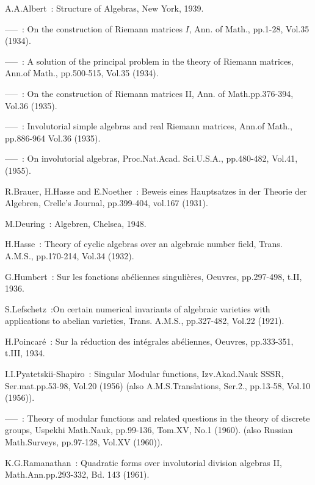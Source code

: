 \begin{thebibliography}{99}\pageoriginale
{} A.A.\@ Albert~: Structure of Algebras, New York, 1939.

 -----~: On the construction of Riemann matrices $I$, Ann.\@
of Math., pp.1-28, Vol.35 (1934).

 -----~: A solution of the principal problem in the theory
  of Riemann matrices, Ann.\@ of Math., pp.\@ 500-515, Vol.35 (1934).

 -----~: On the construction of Riemann matrices II, Ann.\@
  of Math.\@ pp.376-394, Vol.36 (1935).

 -----~: Involutorial simple algebras and real Riemann
  matrices, Ann.\@ of Math., pp.886-964 Vol.\@ 36 (1935).

 -----~: On involutorial algebras, Proc.\@ Nat.Acad.\@
  Sci.\@ U.S.A., pp.480-482, Vol.41, (1955).

 R.\@ Brauer, H.\@ Hasse and E.\@ Noether~: Beweis
  eines Hauptsatzes in der Theorie der Algebren, Crelle's Journal,
  pp.399-404, vol.167 (1931).

 M.\@ Deuring~: Algebren, Chelsea, 1948.

 H.\@ Hasse~: Theory of cyclic algebras over an algebraic
  number field, Trans. A.M.S., pp.170-214, Vol.34 (1932).

 G.\@ Humbert~: Sur les fonctions ab\'eliennes
  singuli\`eres, Oeuvres, pp.297-498, t.II, 1936.

 S.\@ Lefschetz~:\pageoriginale On certain numerical invariants of
  algebraic varieties with applications to abelian varieties, Trans.\@
  A.M.S., pp.327-482, Vol.22 (1921).

 H.\@ Poincar\'e~: Sur la r\'eduction des int\'egrales
  ab\'eliennes, Oeuvres, pp.333-351, t.III, 1934.

 I.I.\@ Pyatetskii-Shapiro~: Singular Modular functions,
  Izv.\@ Akad.\@ Nauk SSSR, Ser.\@ mat.\@ pp.53-98, Vol.20 (1956)
  (also A.M.S.\@ Translations, Ser.\@ 2., pp.13-58, Vol.10 (1956)).

 -----~: Theory of modular functions and related questions
  in the theory of discrete groups, Uspekhi Math.\@ Nauk, pp.99-136,
  Tom.\@ XV, No.1 (1960). (also Russian Math.\@ Surveys, pp.97-128,
  Vol.XV (1960)).

 K.G.\@ Ramanathan~: Quadratic forms over
  involutorial division algebras II, Math.\@ Ann.\@ pp.293-332, Bd.\@
  143 (1961).


\end{thebibliography}
